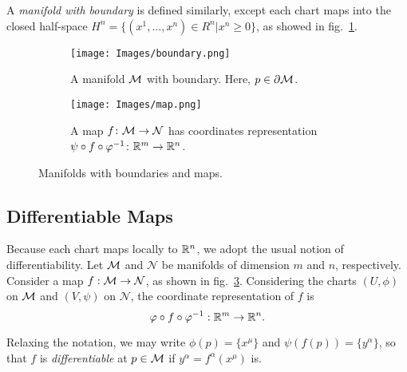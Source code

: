 A \emph{manifold with boundary} is defined similarly, except each chart maps into the closed half-space $H^n = \{ (x^1, \dots, x^n) \in R^n | x^n \geq 0 \}$, as showed in fig.~\ref{fig:boundary}.

\begin{comment}
\begin{figure}
	\centering
	\texttt{[image: Images/boundary.png]}
	\caption{A manifold $\M$ with boundary. Here, $p \in \de \M$.}
	\label{fig:boundary}
\end{figure}
\end{comment}

\begin{figure}
	\centering
	\begin{subfigure}[b]{0.38\textwidth}
		\texttt{[image: Images/boundary.png]}
		\caption{A manifold $\mathcal{M}$ with boundary. Here, $p \in \partial \mathcal{M}$.}
		\label{fig:boundary}
	\end{subfigure}
	\hfill
	\begin{subfigure}[b]{0.42\textwidth}
		\texttt{[image: Images/map.png]}
		\caption{A map $f \colon \mathcal{M} \to \mathcal{N}$ has coordinates representation $\psi \circ f \circ \varphi^{-1} \colon \mathbb{R}^m \to \mathbb{R}^n$.}
		\label{fig:map}
	\end{subfigure}
	\caption{Manifolds with boundaries and maps.}
\end{figure}

\subsection{Differentiable Maps}
Because each chart maps locally to $\mathbb{R}^n$, we adopt the usual notion of differentiability. Let $\mathcal{M}$ and $\mathcal{N} $ be manifolds of dimension $m$ and $n$, respectively. Consider a map $f: \mathcal{M} \to \mathcal{N}$, as shown in fig.~\ref{fig:map}. Considering the charts $(U, \phi)$ on $\mathcal{M}$ and $(V,\psi)$ on $\mathcal{N}$, the coordinate representation of $f$ is
\begin{equation}
	\varphi \circ f \circ \varphi^{-1}: \mathbb{R}^m \to \mathbb{R}^n .
\end{equation}

Relaxing the notation, we may write $\phi(p) = \{x^\mu\}$ and $\psi(f(p)) = \{y^\alpha\}$, so that $f$ is \emph{differentiable} at $p \in \mathcal{M}$ if $y^\alpha = f^\alpha(x^\mu)$ is.

\begin{comment}
\begin{figure}
	\centering
	\texttt{[image: Images/map.png]}
	\caption{A map $f \colon \M \to \mathcal{N}$ has coordinates representation $\psi \circ f \circ \phi^{-1} \colon \R^m \to \R^n$.}
	\label{fig:map}
\end{figure}
\end{comment}

